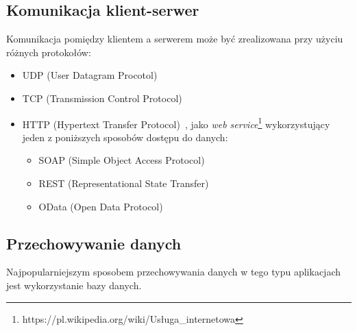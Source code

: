 \subsection{Komunikacja klient-serwer}
Komunikacja pomiędzy klientem a serwerem może być zrealizowana przy użyciu różnych protokołów:
\begin{itemize}
 \item UDP (User Datagram Procotol)~\cite{udp}
 \item TCP (Transmission Control Protocol)~\cite{tcp}
 \item HTTP (Hypertext Transfer Protocol)~\cite{http1,http2}, jako \emph{web service}\footnote{https://pl.wikipedia.org/wiki/Usługa\_internetowa} wykorzystujący jeden z
  poniższych sposobów dostępu do danych:
  \begin{itemize}
   \item SOAP (Simple Object Access Protocol)~\cite{soap}
   \item REST (Representational State Transfer)~\cite{rest}
   \item OData (Open Data Protocol)~\cite{odata}
  \end{itemize}
\end{itemize}


\subsection{Przechowywanie danych}
Najpopularniejszym sposobem przechowywania danych w tego typu aplikacjach jest wykorzystanie bazy danych.